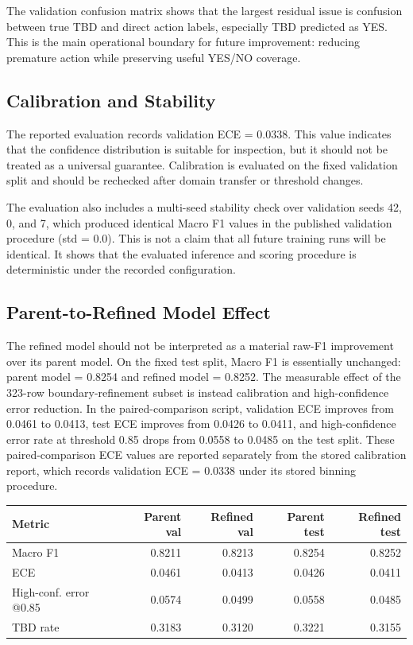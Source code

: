 \documentclass[11pt]{article}
\begin{document}
The validation confusion matrix shows that the largest residual issue is confusion between true TBD and direct action labels, especially TBD predicted as YES. This is the main operational boundary for future improvement: reducing premature action while preserving useful YES/NO coverage.

\subsection{Calibration and Stability}

The reported evaluation records validation ECE = 0.0338. This value indicates that the confidence distribution is suitable for inspection, but it should not be treated as a universal guarantee. Calibration is evaluated on the fixed validation split and should be rechecked after domain transfer or threshold changes.

The evaluation also includes a multi-seed stability check over validation seeds 42, 0, and 7, which produced identical Macro F1 values in the published validation procedure (std = 0.0). This is not a claim that all future training runs will be identical. It shows that the evaluated inference and scoring procedure is deterministic under the recorded configuration.

\subsection{Parent-to-Refined Model Effect}

The refined model should not be interpreted as a material raw-F1 improvement over its parent model. On the fixed test split, Macro F1 is essentially unchanged: parent model = 0.8254 and refined model = 0.8252. The measurable effect of the 323-row boundary-refinement subset is instead calibration and high-confidence error reduction. In the paired-comparison script, validation ECE improves from 0.0461 to 0.0413, test ECE improves from 0.0426 to 0.0411, and high-confidence error rate at threshold 0.85 drops from 0.0558 to 0.0485 on the test split. These paired-comparison ECE values are reported separately from the stored calibration report, which records validation ECE = 0.0338 under its stored binning procedure.

\begin{center}
\begin{tabular}{lrrrr}
\toprule
Metric & Parent val & Refined val & Parent test & Refined test \\
\midrule
Macro F1 & 0.8211 & 0.8213 & 0.8254 & 0.8252 \\
ECE & 0.0461 & 0.0413 & 0.0426 & 0.0411 \\
High-conf. error @0.85 & 0.0574 & 0.0499 & 0.0558 & 0.0485 \\
TBD rate & 0.3183 & 0.3120 & 0.3221 & 0.3155 \\
\bottomrule
\end{tabular}
\end{center}
\end{document}
